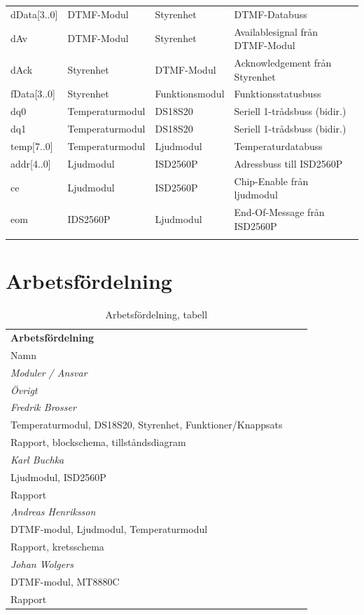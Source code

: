 \documentclass[a4paper,11pt]{article}
\begin{document}
\begin{table} [H]
\begin{tabular}{l l l l}
		dData[3..0] & DTMF-Modul & Styrenhet & DTMF-Databuss\\
		dAv & DTMF-Modul & Styrenhet & Availablesignal från DTMF-Modul\\
		dAck & Styrenhet & DTMF-Modul & Acknowledgement från Styrenhet\\

		fData[3..0] & Styrenhet & Funktionsmodul & Funktionsstatusbuss\\

		dq0 & Temperaturmodul & DS18S20 & Seriell 1-trådsbuss (bidir.)\\
		dq1 & Temperaturmodul & DS18S20 & Seriell 1-trådsbuss (bidir.)\\

		temp[7..0] & Temperaturmodul & Ljudmodul & Temperaturdatabuss\\

		addr[4..0] & Ljudmodul & ISD2560P & Adressbuss till ISD2560P\\
		ce & Ljudmodul & ISD2560P & Chip-Enable från ljudmodul\\
		eom & IDS2560P & Ljudmodul & End-Of-Message från ISD2560P\\\\
	\end{tabular}
	\end{table}

	\section{Arbetsfördelning}
	\label{sec:arbetsSec}
	\begin{table} [H]
	\caption{Arbetsfördelning, tabell} 
	\label{tab:arbetsTabell}

		\begin{tabular}{l l l}
		{\bf Arbetsfördelning}
		\\{Namn} \\ {\it Moduler / Ansvar} \\ {\it Övrigt}\\
		\hline
				{\it Fredrik Brosser}\\
				 Temperaturmodul, DS18S20, Styrenhet, Funktioner/Knappsats\\
				 Rapport, blockschema, tillståndsdiagram\\
				{\it Karl Buchka}\\
				 Ljudmodul, ISD2560P\\
				 Rapport\\
				{\it Andreas Henriksson}\\
				 DTMF-modul, Ljudmodul, Temperaturmodul\\
				 Rapport, kretsschema\\
				{\it Johan Wolgers}\\
				 DTMF-modul, MT8880C\\
				 Rapport\\
		\end{tabular}
	\end{table}
		
\end{document}
